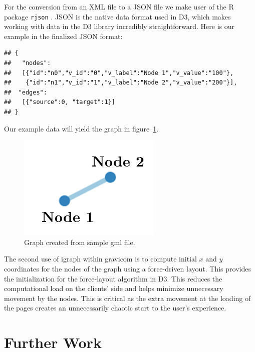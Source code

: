 \documentclass{article}\usepackage[]{graphicx}\usepackage[]{color}
\makeatletter
\newenvironment{kframe}{%
 \def\at@end@of@kframe{}%
 \ifinner\ifhmode%
  \def\at@end@of@kframe{\end{minipage}}%
  \begin{minipage}{\columnwidth}%
 \fi\fi%
 \def\FrameCommand##1{\hskip\@totalleftmargin \hskip-\fboxsep
 \colorbox{shadecolor}{##1}\hskip-\fboxsep
     \hskip-\linewidth \hskip-\@totalleftmargin \hskip\columnwidth}%
 \MakeFramed {\advance\hsize-\width
   \@totalleftmargin\z@ \linewidth\hsize
   \@setminipage}}%
 {\par\unskip\endMakeFramed%
 \at@end@of@kframe}
\newenvironment{knitrout}{}{} %
\makeatother
\begin{document}
For the conversion from an  XML file  to a JSON file we make user of the R package {\tt rjson} \cite{acb-rjson}.  JSON is the native data format used in D3, which  makes working with data in the D3 library incredibly straightforward. Here is our example in the finalized JSON format:
\begin{knitrout}
\color{fgcolor}\begin{kframe}
\begin{verbatim}
## {
##   "nodes":
##   [{"id":"n0","v_id":"0","v_label":"Node 1","v_value":"100"}, 
##    {"id":"n1","v_id":"1","v_label":"Node 2","v_value":"200"}], 
##  "edges":
##   [{"source":0, "target":1}]
## }
\end{verbatim}
\end{kframe}
\end{knitrout}

Our example data will yield the graph in figure~\ref{fig:samplegraph}.

\begin{figure}[H]
\centering
\includegraphics{images/samplegraph.png}
\caption{\label{fig:samplegraph} Graph created from sample gml file.}
\end{figure}
The second use of igraph within gravicom is to compute initial $x$ and $y$ coordinates for the nodes of the graph using a force-driven layout. This provides the initialization for the force-layout algorithm in D3. This reduces the computational load on the clients' side and helps minimize unnecessary movement by the nodes. This is critical as the extra movement at the loading of the pages creates an unnecessarily chaotic start to the user's experience. 




\section{Further Work}
\end{document}
